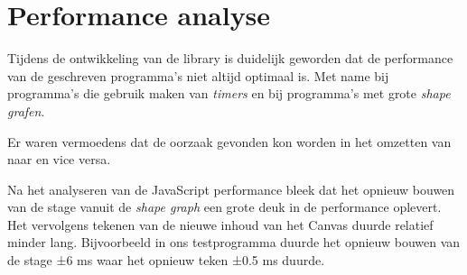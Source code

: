 \section{Performance analyse}
Tijdens de ontwikkeling van de library is duidelijk geworden dat de performance van de geschreven programma's niet altijd optimaal is. Met name bij programma's die gebruik maken van \emph{timers} en bij programma's met grote \emph{shape grafen}.


Er waren vermoedens dat de oorzaak gevonden kon worden in het omzetten van  naar  en vice versa.

Na het analyseren van de JavaScript performance bleek dat het opnieuw bouwen van de stage vanuit de \emph{shape graph} een grote deuk in de performance oplevert. Het vervolgens tekenen van de nieuwe inhoud van het Canvas duurde relatief minder lang. Bijvoorbeeld in ons testprogramma duurde het opnieuw bouwen van de stage ±6 ms waar het opnieuw teken ±0.5 ms duurde.


